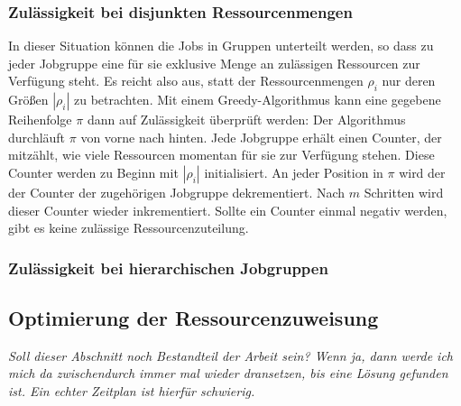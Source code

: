 \documentclass{scrreprt}
\begin{document}
\subsubsection{Zulässigkeit bei disjunkten Ressourcenmengen}
In dieser Situation können die Jobs in Gruppen unterteilt werden, so dass zu jeder Jobgruppe eine für sie exklusive Menge an zulässigen Ressourcen zur Verfügung steht.
Es reicht also aus, statt der Ressourcenmengen $\rho_i$ nur deren Größen $|\rho_i|$ zu betrachten.
Mit einem Greedy-Algorithmus kann eine gegebene Reihenfolge $\pi$ dann auf Zulässigkeit überprüft werden:
Der Algorithmus durchläuft $\pi$ von vorne nach hinten.
Jede Jobgruppe erhält einen Counter, der mitzählt, wie viele Ressourcen momentan für sie zur Verfügung stehen.
Diese Counter werden zu Beginn mit $|\rho_i|$ initialisiert.
An jeder Position in $\pi$ wird der der Counter der zugehörigen Jobgruppe dekrementiert.
Nach $m$ Schritten wird dieser Counter wieder inkrementiert.
Sollte ein Counter einmal negativ werden, gibt es keine zulässige Ressourcenzuteilung.

\subsubsection{Zulässigkeit bei hierarchischen Jobgruppen}
%


\subsection{Optimierung der Ressourcenzuweisung}
\label{subsec:OptimierungDerRessourcenzuweisung}
\textit{Soll dieser Abschnitt noch Bestandteil der Arbeit sein? Wenn ja, dann werde ich mich da zwischendurch immer mal wieder dransetzen,
bis eine Lösung gefunden ist. Ein echter Zeitplan ist hierfür schwierig.}
\end{document}
